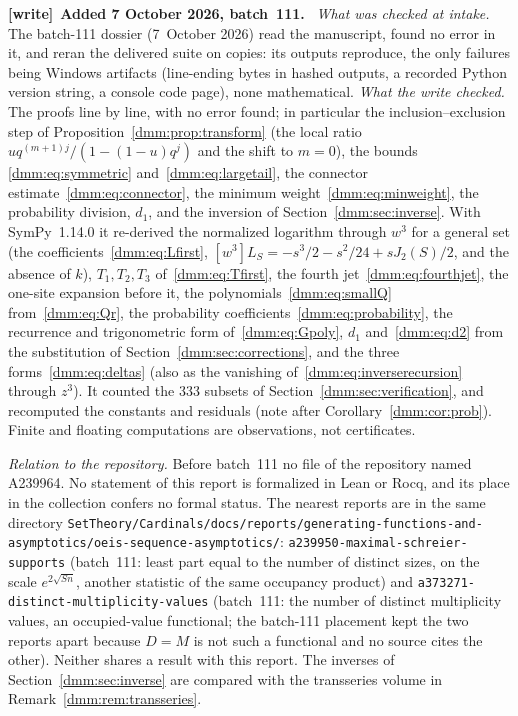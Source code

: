 \documentclass[11pt,letterpaper]{article}
\numberwithin{equation}{section}
\theoremstyle{definition}\newtheorem{definition}[theorem]{Definition}
\theoremstyle{remark}\newtheorem{remark}[theorem]{Remark}
\newcommand{\file}[1]{\nolinkurl{#1}}
\newenvironment{writenote}[1][]{\par\smallskip\begingroup\small
 \noindent\textbf{[write]}\if\relax\detokenize{#1}\relax\else~\textbf{#1.}\fi\ }%
 {\par\endgroup\smallskip}
\begin{document}
\begin{writenote}[Added 7 October 2026, batch~111]
\emph{What was checked at intake.} The batch-111 dossier (7~October 2026)
read the manuscript, found no error in it, and reran the delivered suite on
copies: its outputs reproduce, the only failures being Windows artifacts
(line-ending bytes in hashed outputs, a recorded Python version string, a
console code page), none mathematical. \emph{What the write checked.} The
proofs line by line, with no error found; in particular the
inclusion--exclusion step of Proposition~\ref{dmm:prop:transform} (the
local ratio $uq^{(m+1)j}/(1-(1-u)q^j)$ and the shift to $m=0$), the bounds
\eqref{dmm:eq:symmetric} and~\eqref{dmm:eq:largetail}, the connector
estimate~\eqref{dmm:eq:connector}, the minimum weight~\eqref{dmm:eq:minweight},
the probability division, $d_1$, and the inversion of
Section~\ref{dmm:sec:inverse}. With SymPy~1.14.0 it re-derived the
normalized logarithm through $w^3$ for a general set (the
coefficients~\eqref{dmm:eq:Lfirst}, $[w^3]L_S=-s^3/2-s^2/24+sJ_2(S)/2$, and
the absence of $k$), $T_1,T_2,T_3$ of~\eqref{dmm:eq:Tfirst}, the fourth
jet~\eqref{dmm:eq:fourthjet}, the one-site expansion before it, the
polynomials~\eqref{dmm:eq:smallQ} from~\eqref{dmm:eq:Qr}, the probability
coefficients~\eqref{dmm:eq:probability}, the recurrence and trigonometric
form of~\eqref{dmm:eq:Gpoly}, $d_1$ and~\eqref{dmm:eq:d2} from the
substitution of Section~\ref{dmm:sec:corrections}, and the three
forms~\eqref{dmm:eq:deltas} (also as the vanishing of~\eqref{dmm:eq:inverserecursion}
through $z^3$). It counted the 333 subsets of Section~\ref{dmm:sec:verification},
and recomputed the constants and residuals (note after
Corollary~\ref{dmm:cor:prob}). Finite and floating computations are
observations, not certificates.

\emph{Relation to the repository.} Before batch~111 no file of the
repository named A239964. No statement of this report is formalized in Lean
or Rocq, and its place in the collection confers no formal status. The
nearest reports are in the same directory
\file{SetTheory/Cardinals/docs/reports/generating-functions-and-asymptotics/oeis-sequence-asymptotics/}:
\file{a239950-maximal-schreier-supports} (batch~111: least part equal to
the number of distinct sizes, on the scale $e^{2\sqrt{Sn}}$, another
statistic of the same occupancy product) and
\file{a373271-distinct-multiplicity-values} (batch~111: the number of
distinct multiplicity values, an occupied-value functional; the batch-111
placement kept the two reports apart because $D=M$ is not such a
functional and no source cites the other). Neither shares a result with
this report. The inverses of Section~\ref{dmm:sec:inverse} are compared with
the transseries volume in Remark~\ref{dmm:rem:transseries}.
\end{writenote}
\end{document}
